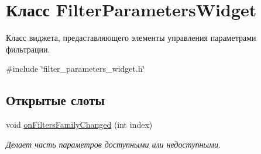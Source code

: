 \hypertarget{class_filter_parameters_widget}{}\section{Класс Filter\+Parameters\+Widget}
\label{class_filter_parameters_widget}


Класс виджета, предаставляющего элементы управления параметрами фильтрации.  




{\ttfamily \#include \char`\"{}filter\+\_\+parameters\+\_\+widget.\+h\char`\"{}}

\subsection*{Открытые слоты}
\begin{DoxyCompactItemize}
\item 
void \hyperlink{class_filter_parameters_widget_a64e5feb9fe8915417d9e753243d74c84}{on\+Filters\+Family\+Changed} (int index)
\begin{DoxyCompactList}\small\item\em Делает часть параметров доступными или недоступными. \end{DoxyCompactList}\end{DoxyCompactItemize}
